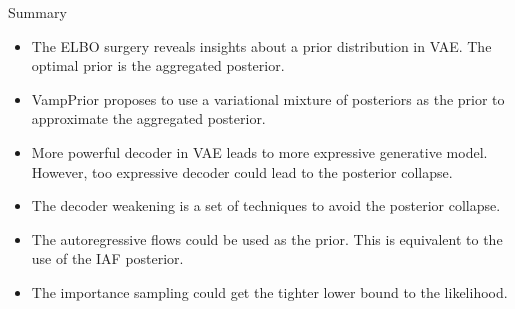 \documentclass{beamer}
\begin{document}
\begin{frame}{Summary}
	\begin{itemize}
		\item The ELBO surgery reveals insights about a prior distribution in VAE. The optimal prior is the aggregated posterior.
		\item VampPrior proposes to use a variational mixture of posteriors as the prior to approximate the aggregated posterior.
		\item More powerful decoder in VAE leads to more expressive generative model. However, too expressive decoder could lead to the posterior collapse.
		\item The decoder weakening is a set of techniques to avoid the posterior collapse.
		\item The autoregressive flows could be used as the prior. This is equivalent to the use of the IAF posterior. 
		\item The importance sampling could get the tighter lower bound to the likelihood.
	\end{itemize}
\end{frame}
\end{document}
